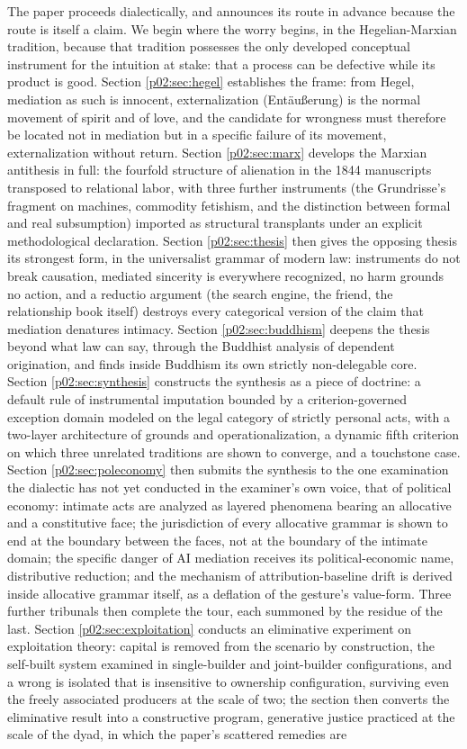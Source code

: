 The paper proceeds dialectically, and announces its route in advance because the route is itself a claim. We begin where the worry begins, in the Hegelian-Marxian tradition, because that tradition possesses the only developed conceptual instrument for the intuition at stake: that a process can be defective while its product is good. Section \ref{p02:sec:hegel} establishes the frame: from Hegel, mediation as such is innocent, externalization (Ent\"au{\ss}erung) is the normal movement of spirit and of love, and the candidate for wrongness must therefore be located not in mediation but in a specific failure of its movement, externalization without return. Section \ref{p02:sec:marx} develops the Marxian antithesis in full: the fourfold structure of alienation in the 1844 manuscripts transposed to relational labor, with three further instruments (the Grundrisse's fragment on machines, commodity fetishism, and the distinction between formal and real subsumption) imported as structural transplants under an explicit methodological declaration. Section \ref{p02:sec:thesis} then gives the opposing thesis its strongest form, in the universalist grammar of modern law: instruments do not break causation, mediated sincerity is everywhere recognized, no harm grounds no action, and a reductio argument (the search engine, the friend, the relationship book itself) destroys every categorical version of the claim that mediation denatures intimacy. Section \ref{p02:sec:buddhism} deepens the thesis beyond what law can say, through the Buddhist analysis of dependent origination, and finds inside Buddhism its own strictly non-delegable core. Section \ref{p02:sec:synthesis} constructs the synthesis as a piece of doctrine: a default rule of instrumental imputation bounded by a criterion-governed exception domain modeled on the legal category of strictly personal acts, with a two-layer architecture of grounds and operationalization, a dynamic fifth criterion on which three unrelated traditions are shown to converge, and a touchstone case. Section \ref{p02:sec:poleconomy} then submits the synthesis to the one examination the dialectic has not yet conducted in the examiner's own voice, that of political economy: intimate acts are analyzed as layered phenomena bearing an allocative and a constitutive face; the jurisdiction of every allocative grammar is shown to end at the boundary between the faces, not at the boundary of the intimate domain; the specific danger of AI mediation receives its political-economic name, distributive reduction; and the mechanism of attribution-baseline drift is derived inside allocative grammar itself, as a deflation of the gesture's value-form. Three further tribunals then complete the tour, each summoned by the residue of the last. Section \ref{p02:sec:exploitation} conducts an eliminative experiment on exploitation theory: capital is removed from the scenario by construction, the self-built system examined in single-builder and joint-builder configurations, and a wrong is isolated that is insensitive to ownership configuration, surviving even the freely associated producers at the scale of two; the section then converts the eliminative result into a constructive program, generative justice practiced at the scale of the dyad, in which the paper's scattered remedies are 